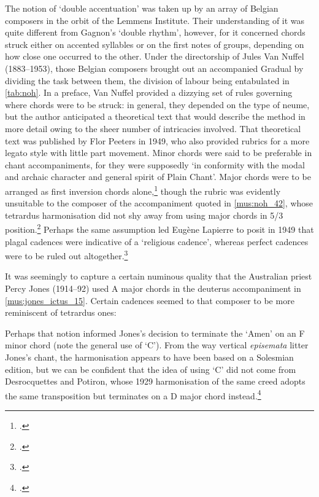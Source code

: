 The notion of `double accentuation' was taken up by an array of Belgian composers in the orbit of the Lemmens Institute.
Their understanding of it was quite different from Gagnon's `double rhythm', however, for it concerned chords struck either on accented syllables or on the first notes of groups, depending on how close one occurred to the other.
Under the directorship of Jules Van Nuffel (1883--1953), those Belgian composers brought out an accompanied Gradual by dividing the task between them, the division of labour being entabulated in \cref{tab:noh}.
In a preface, Van Nuffel provided a dizzying set of rules governing where chords were to be struck: in general, they depended on the type of neume, but the author anticipated a theoretical text that would describe the method in more detail owing to the sheer number of intricacies involved.
That theoretical text was published by Flor Peeters in 1949, who also provided rubrics for a more legato style with little part movement.
Minor chords were said to be preferable in chant accompaniments, for they were supposedly `in conformity with the modal and archaic character and general spirit of Plain Chant'.
Major chords were to be arranged as first inversion chords alone,\footcite[13--14, 22]{PeetersPracticalMethodPlainChant1949} though the rubric was evidently unsuitable to the composer of the accompaniment quoted in \cref{mus:noh_42}, whose tetrardus harmonisation did not shy away from using major chords in 5/3 position.\footcite[pp.~xi*--xiv*, 42]{KyrialeMissapro1942}
Perhaps the same assumption led Eugène Lapierre to posit in 1949 that plagal cadences were indicative of a `religious cadence', whereas perfect cadences were to be ruled out altogether.\footcite[pp.~12, 24]{LapierreGregorianChantAccompaniment1949}

It was seemingly to capture a certain numinous quality that the Australian priest Percy Jones (1914--92) used A major chords in the deuterus accompaniment in \cref{mus:jones_ictus_15}.
Certain cadences seemed to that composer to be more reminiscent of tetrardus ones:

{\cite[pp.~v, 15]{JonesHymnalStPius1952}}
\noindent
Perhaps that notion informed Jones's decision to terminate the `Amen' on an F\kern 1pt\sharp{} minor chord (note the general use of `C'\kern 1pt\sharp{}).
From the way vertical \emph{episemata} litter Jones's chant, the harmonisation appears to have been based on a Solesmian edition, but we can be confident that the idea of using `C'\kern 1pt\sharp{} did not come from Desrocquettes and Potiron, whose 1929 harmonisation of the same creed adopts the same transposition but terminates on a D major chord instead.\footcite[76]{DesrocquettesAccompagnementKyrialeVatican1929}

